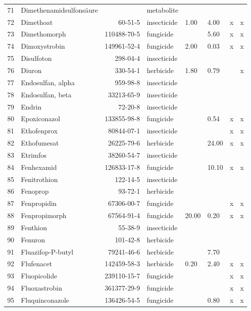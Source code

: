 \begin{longtable}{lp{4cm}rlp{1cm}p{1.5cm}p{1.5cm}p{1cm}}
  71 & Dimethenamidsulfonsäure &  & metabolite &  &  &  &  \\ 
  72 & Dimethoat & 60-51-5 & insecticide & 1.00 & 4.00 & x & x \\ 
  73 & Dimethomorph & 110488-70-5 & fungicide &  & 5.60 & x & x \\ 
  74 & Dimoxystrobin & 149961-52-4 & fungicide & 2.00 & 0.03 & x & x \\ 
  75 & Disulfoton & 298-04-4 & insecticide &  &  &  &  \\ 
  76 & Diuron & 330-54-1 & herbicide & 1.80 & 0.79 &  & x \\ 
  77 & Endosulfan, alpha & 959-98-8 & insecticide &  &  &  &  \\ 
  78 & Endosulfan, beta & 33213-65-9 & insecticide &  &  &  &  \\ 
  79 & Endrin & 72-20-8 & insecticide &  &  &  &  \\ 
  80 & Epoxiconazol & 133855-98-8 & fungicide &  & 0.54 & x & x \\ 
  81 & Ethofenprox & 80844-07-1 & insecticide &  &  & x & x \\ 
  82 & Ethofumesat & 26225-79-6 & herbicide &  & 24.00 & x & x \\ 
  83 & Etrimfos & 38260-54-7 & insecticide &  &  &  &  \\ 
  84 & Fenhexamid & 126833-17-8 & fungicide &  & 10.10 & x & x \\ 
  85 & Fenitrothion & 122-14-5 & insecticide &  &  &  &  \\ 
  86 & Fenoprop & 93-72-1 & herbicide &  &  &  &  \\ 
  87 & Fenpropidin & 67306-00-7 & fungicide &  &  & x & x \\ 
  88 & Fenpropimorph & 67564-91-4 & fungicide & 20.00 & 0.20 & x & x \\ 
  89 & Fenthion & 55-38-9 & insecticide &  &  &  &  \\ 
  90 & Fenuron & 101-42-8 & herbicide &  &  &  &  \\ 
  91 & Fluazifop-P-butyl & 79241-46-6 & herbicide &  & 7.70 &  &  \\ 
  92 & Flufenacet & 142459-58-3 & herbicide & 0.20 & 2.40 & x & x \\ 
  93 & Fluopicolide & 239110-15-7 & fungicide &  &  & x & x \\ 
  94 & Fluoxastrobin & 361377-29-9 & fungicide &  &  & x & x \\ 
  95 & Fluquinconazole & 136426-54-5 & fungicide &  & 0.80 & x & x \\ 

\end{longtable}
